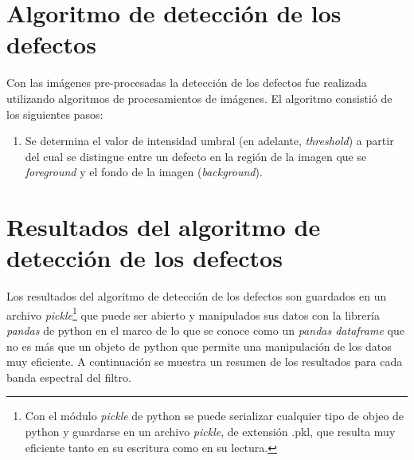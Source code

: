 \begin{enumerate}
\begin{figure}[H]
\begin{floatrow}
		\end{floatrow}
	\end{figure}
	
	\vspace{1.0cm}
	\vspace{1.0cm}
	
\end{enumerate}

\singlespacing
\section*{Algoritmo de detección de los defectos}

\hspace{0.5cm}Con las imágenes pre-procesadas la detección de los defectos fue realizada utilizando algoritmos de procesamientos de imágenes. El algoritmo consistió de los siguientes pasos:
\begin{enumerate}
	\item Se determina el valor de intensidad umbral (en adelante, \textit{threshold}) a partir del cual se distingue entre un defecto en la región de la imagen que se \textit{foreground} y el fondo de la imagen (\textit{background}). %
\end{enumerate}





\singlespacing
\section*{Resultados del algoritmo de detección de los defectos}


\hspace{0.5cm}Los resultados del algoritmo de detección de los defectos son guardados en un archivo \textit{pickle}\footnote{Con el módulo \textit{pickle} de python se puede serializar cualquier tipo de objeo de python y guardarse en un archivo \textit{pickle}, de extensión .pkl, que resulta muy eficiente tanto en su escritura como en su lectura.} que puede ser abierto y manipulados sus datos con la librería \textit{pandas} de python en el marco de lo que se conoce como un \textit{pandas dataframe} que no es más que un objeto de python que permite una manipulación de los datos muy eficiente. A continuación se muestra un resumen de los resultados para cada banda espectral del filtro.

